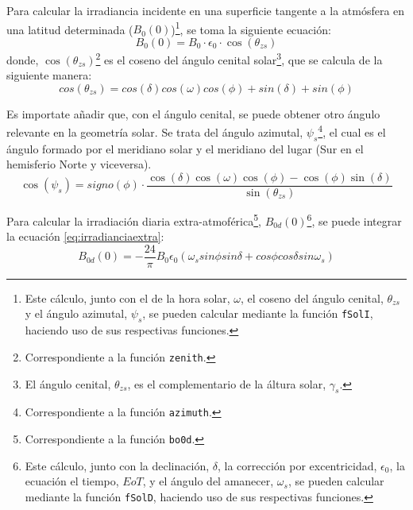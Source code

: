 Para calcular la irradiancia incidente en una superficie tangente a la atmósfera en una latitud determinada (\(B_0(0)\))\footnote{Este cálculo, junto con el de la hora solar, \(\omega\), el coseno del ángulo cenital, \(\theta_{zs}\) y  el ángulo azimutal, \(\psi_s\), se pueden calcular mediante la función \texttt{fSolI}, haciendo uso de sus respectivas funciones.}, se toma la siguiente ecuación: 
\begin{equation}
B_0(0)=B_0 \cdot \epsilon_0 \cdot \cos(\theta_{zs})
\label{eq:irradianciaextra}
\end{equation}
donde, \(\cos(\theta_{zs})\)\footnote{Correspondiente a la función \texttt{zenith}.} es el coseno del ángulo cenital solar\footnote{El ángulo cenital, \(\theta_{zs}\), es el complementario de la áltura solar, \(\gamma_s\).}, que se calcula de la siguiente manera:
\begin{equation}
cos(\theta_{zs})=cos(\delta)cos(\omega)cos(\phi)+sin(\delta)+sin(\phi)
\end{equation}

Es importate añadir que, con el ángulo cenital, se puede obtener otro ángulo relevante en la geometría solar. Se trata del ángulo azimutal, \(\psi_s\)\footnote{Correspondiente a la función \texttt{azimuth}.}, el cual es el ángulo formado por el meridiano solar y el meridiano del lugar (Sur en el hemisferio Norte y viceversa). 
\begin{equation}
\cos(\psi_s)=signo(\phi)\cdot \frac{\cos(\delta)\cos(\omega)\cos(\phi)-\cos(\phi)\sin(\delta)}{\sin(\theta_{zs})}
\end{equation}

Para calcular la irradiación diaria extra-atmoférica\footnote{Correspondiente a la función \texttt{bo0d}.}, \(B_{0d}(0)\)\footnote{Este cálculo, junto con la declinación, \(\delta\), la corrección por excentricidad, \(\epsilon_0\), la ecuación el tiempo, \(EoT\), y el ángulo del amanecer, \(\omega_s\), se pueden calcular mediante la función \texttt{fSolD}, haciendo uso de sus respectivas funciones.}, se puede integrar la ecuación \ref{eq:irradianciaextra}:
\begin{equation}
B_{0d}(0)=-\frac{24}{\pi}B_0\epsilon_0(\omega_s sin\phi sin\delta + cos\phi cos\delta sin \omega_s)
\label{eq:irradiacionextra}
\end{equation}

